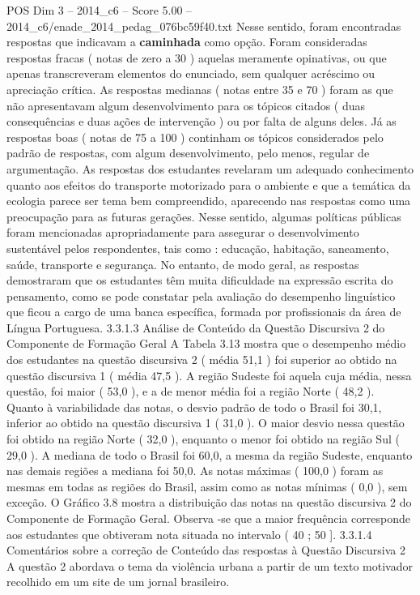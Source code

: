 \begin{textsample}{POS Dim 3 – 2014\_c6 – Score 5.00 – 2014\_c6/enade\_2014\_pedag\_076bc59f40.txt}
Nesse sentido, foram encontradas respostas que indicavam a \textbf{caminhada} como opção.
Foram consideradas respostas fracas ( notas de zero a 30 ) aquelas meramente opinativas, ou que apenas transcreveram elementos do enunciado, sem qualquer acréscimo ou apreciação crítica.
As respostas medianas ( notas entre 35 e 70 ) foram as que não apresentavam algum desenvolvimento para os tópicos citados ( duas consequências e duas ações de intervenção ) ou por falta de alguns deles.
Já as respostas boas ( notas de 75 a 100 ) continham os tópicos considerados pelo padrão de respostas, com algum desenvolvimento, pelo menos, regular de argumentação.
As respostas dos estudantes revelaram um adequado conhecimento quanto aos efeitos do transporte motorizado para o ambiente e que a temática da ecologia parece ser tema bem compreendido, aparecendo nas respostas como uma preocupação para as futuras gerações.
Nesse sentido, algumas políticas públicas foram mencionadas apropriadamente para assegurar o desenvolvimento sustentável pelos respondentes, tais como : educação, habitação, saneamento, saúde, transporte e segurança.
No entanto, de modo geral, as respostas demostraram que os estudantes têm muita dificuldade na expressão escrita do pensamento, como se pode constatar pela avaliação do desempenho linguístico que ficou a cargo de uma banca específica, formada por profissionais da área de Língua Portuguesa. 3.3.1.3 Análise de Conteúdo da Questão Discursiva 2 do Componente de Formação Geral A Tabela 3.13 mostra que o desempenho médio dos estudantes na questão discursiva 2 ( média 51,1 ) foi superior ao obtido na questão discursiva 1 ( média 47,5 ).
A região Sudeste foi aquela cuja média, nessa questão, foi maior ( 53,0 ), e a de menor média foi a região Norte ( 48,2 ).
Quanto à variabilidade das notas, o desvio padrão de todo o Brasil foi 30,1, inferior ao obtido na questão discursiva 1 ( 31,0 ).
O maior desvio nessa questão foi obtido na região Norte ( 32,0 ), enquanto o menor foi obtido na região Sul ( 29,0 ).
A mediana de todo o Brasil foi 60,0, a mesma da região Sudeste, enquanto nas demais regiões a mediana foi 50,0.
As notas máximas ( 100,0 ) foram as mesmas em todas as regiões do Brasil, assim como as notas mínimas ( 0,0 ), sem exceção.
O Gráfico 3.8 mostra a distribuição das notas na questão discursiva 2 do Componente de Formação Geral.
Observa -se que a maior frequência corresponde aos estudantes que obtiveram nota situada no intervalo ( 40 ; 50 ]. 3.3.1.4 Comentários sobre a correção de Conteúdo das respostas à Questão Discursiva 2 A questão 2 abordava o tema da violência urbana a partir de um texto motivador recolhido em um site de um jornal brasileiro.

\end{textsample}
